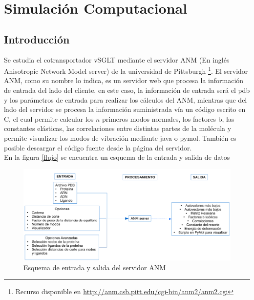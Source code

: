 \chapter{Simulaci\'{o}n Computacional}

\section{Introducci\'{o}n}
Se estudia el cotransportador vSGLT mediante el servidor ANM (En ingl\'{e}s Anisotropic Network Model server) de la universidad de Pittsburgh \cite{Eyal2015}\footnote{Recurso disponible en \url{http://anm.csb.pitt.edu/cgi-bin/anm2/anm2.cgi}}. El servidor ANM, como su nombre lo indica, es un servidor web que procesa la informaci\'{o}n de entrada del lado del cliente, en este caso, la informaci\'{o}n de entrada ser\'{a} el pdb y los par\'{a}metros de entrada para realizar los c\'{a}lculos del ANM, mientras que del lado del servidor se procesa la informaci\'{o}n suministrada v\'{i}a un c\'{o}digo escrito en C, el cual permite calcular los $n$ primeros modos normales, los factores b, las constantes el\'{a}sticas, las correlaciones entre distintas partes de la mol\'{e}cula y permite visualizar los modos de vibraci\'{o}n mediante java o pymol. Tambi\'{e}n es posible descargar el c\'{o}digo fuente desde la p\'{a}gina del servidor.\\

En la figura \ref{flujo} se encuentra un esquema de la entrada y salida de datos
\begin{figure}
 \centering
    \includegraphics[scale=0.6]{./Kap4/flujo.pdf} 
\caption{Esquema de entrada y salida del servidor ANM}\label{fig:flujo}
\end{figure}


